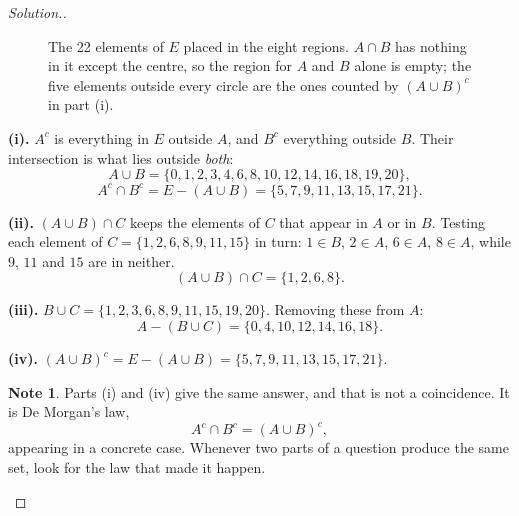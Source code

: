 \documentclass[11pt,a4paper]{article}
\theoremstyle{definition}
\newtheorem{note}[thm]{Note}
\newenvironment{solution}
  {\renewcommand{\qedsymbol}{}\begin{proof}[\textit{Solution}.]}
  {\end{proof}}
\begin{document}
\begin{solution}
\begin{figure}[H]
\centering
{}
\caption{The 22 elements of $E$ placed in the eight regions. $A\cap B$ has nothing in it except the centre, so the region for $A$ and $B$ alone is empty; the five elements outside every circle are the ones counted by $(A\cup B)^c$ in part (i).}
\end{figure}


\textbf{(i).} $A^c$ is everything in $E$ outside $A$, and $B^c$ everything outside $B$.
Their intersection is what lies outside \emph{both}:
$$A\cup B=\{0,1,2,3,4,6,8,10,12,14,16,18,19,20\},$$
$$A^c\cap B^c=E-(A\cup B)=\{5,7,9,11,13,15,17,21\}.$$

\textbf{(ii).} $(A\cup B)\cap C$ keeps the elements of $C$ that appear in $A$ or in $B$.
Testing each element of $C=\{1,2,6,8,9,11,15\}$ in turn: $1\in B$, $2\in A$, $6\in A$,
$8\in A$, while $9$, $11$ and $15$ are in neither.
$$(A\cup B)\cap C=\{1,2,6,8\}.$$

\textbf{(iii).} $B\cup C=\{1,2,3,6,8,9,11,15,19,20\}$. Removing these from $A$:
$$A-(B\cup C)=\{0,4,10,12,14,16,18\}.$$

\textbf{(iv).} $(A\cup B)^c=E-(A\cup B)=\{5,7,9,11,13,15,17,21\}.$

\begin{note}
Parts (i) and (iv) give the same answer, and that is not a coincidence. It is De
Morgan's law,
$$A^c\cap B^c=(A\cup B)^c,$$
appearing in a concrete case. Whenever two parts of a question produce the same set, look
for the law that made it happen.
\end{note}
\end{solution}
\end{document}
